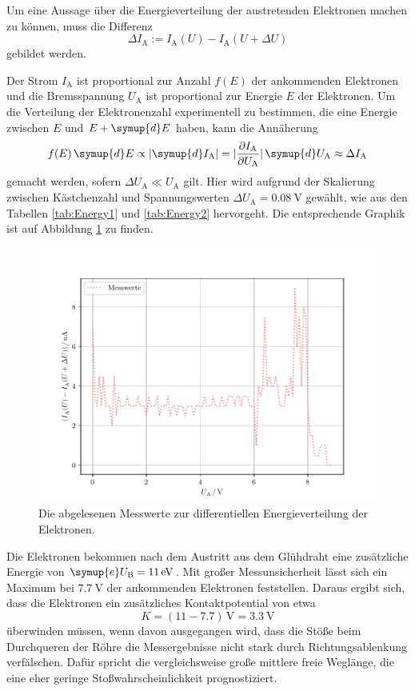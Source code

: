Um eine Aussage über die Energieverteilung der austretenden Elektronen machen zu können, muss die Differenz 
\begin{equation*}
    \Delta I_\text{A} := I_\text{A} (U) - I_\text{A} (U+\Delta U)
\end{equation*}
gebildet werden.

Der Strom $I_\text{A}$ ist proportional zur Anzahl $f(E)$ der ankommenden Elektronen und die Bremsspannung $U_\text{A}$ ist proportional zur Energie $E$ der Elektronen. 
Um die Verteilung der Elektronenzahl experimentell zu bestimmen, die eine Energie zwischen $E$ und $E+\symup{d}E$ haben, kann die Annäherung 
\begin{equation*}
    f(E)\,\symup{d}E \propto |\symup{d} I_\text{A}| = |\frac{\partial I_\text{A}}{\partial U_\text{A}}| \, \symup{d}U_\text{A} \approx \Delta I_\text{A} 
\end{equation*}
gemacht werden, sofern $\Delta U_\text{A} \ll U_\text{A}$ gilt. 
Hier wird aufgrund der Skalierung zwischen Kästchenzahl und Spannungswerten $\Delta U_\text{A} = \SI{0.08}{\volt}$ gewählt, wie aus den 
Tabellen \ref{tab:Energy1} und \ref{tab:Energy2} hervorgeht. 
Die entsprechende Graphik ist auf Abbildung \ref{fig:EnergieDiffAb} zu finden. 
\begin{figure}
    \centering
    \includegraphics[width=\textwidth]{plots/EnergieDiff2.pdf}
    \caption{Die abgelesenen Messwerte zur differentiellen Energieverteilung der Elektronen.}
    \label{fig:EnergieDiffAb}
\end{figure}
Die Elektronen bekommen nach dem Austritt aus dem Glühdraht eine zusätzliche Energie von $\symup{e}U_\text{B}=\SI{11}{\electronvolt}$.
Mit großer Messunsicherheit lässt sich ein Maximum bei $\SI{7.7}{\volt}$ der ankommenden Elektronen feststellen. 
Daraus ergibt sich, dass die Elektronen ein zusätzliches Kontaktpotential von etwa
\begin{equation}
    K=(11-7.7)\,\si{\volt}=\SI{3.3}{\volt}
\end{equation}
überwinden müssen, wenn davon ausgegangen wird, dass die Stöße beim Durchqueren der Röhre die Messergebnisse nicht 
stark durch Richtungsablenkung verfälschen. 
Dafür spricht die vergleichsweise große mittlere freie Weglänge, die eine eher geringe Stoßwahrscheinlichkeit prognostiziert. 

